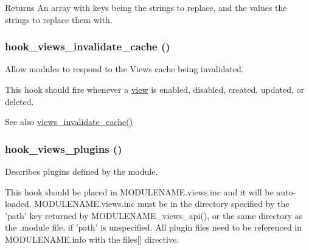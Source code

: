 \begin{DoxyReturn}{Returns}
An array with keys being the strings to replace, and the values the strings to replace them with. 
\end{DoxyReturn}
\hypertarget{group__views__hooks_ga4d3be7a9646f70c9a5d321931135dd84}{
\subsubsection[{hook\_\-views\_\-invalidate\_\-cache}]{\setlength{\rightskip}{0pt plus 5cm}hook\_\-views\_\-invalidate\_\-cache ()}}
\label{group__views__hooks_ga4d3be7a9646f70c9a5d321931135dd84}
Allow modules to respond to the Views cache being invalidated.

This hook should fire whenever a \hyperlink{classview}{view} is enabled, disabled, created, updated, or deleted.

\begin{DoxySeeAlso}{See also}
\hyperlink{views_8module_a51e180fd9efb14998bb83aa5c9118867}{views\_\-invalidate\_\-cache()} 
\end{DoxySeeAlso}
\hypertarget{group__views__hooks_ga23f6e9972b2ed84fc54b7ff63f44477d}{
\subsubsection[{hook\_\-views\_\-plugins}]{\setlength{\rightskip}{0pt plus 5cm}hook\_\-views\_\-plugins ()}}
\label{group__views__hooks_ga23f6e9972b2ed84fc54b7ff63f44477d}
Describes plugins defined by the module.

This hook should be placed in MODULENAME.views.inc and it will be auto-\/loaded. MODULENAME.views.inc must be in the directory specified by the 'path' key returned by MODULENAME\_\-views\_\-api(), or the same directory as the .module file, if 'path' is unspecified. All plugin files need to be referenced in MODULENAME.info with the files\mbox{[}\mbox{]} directive.

